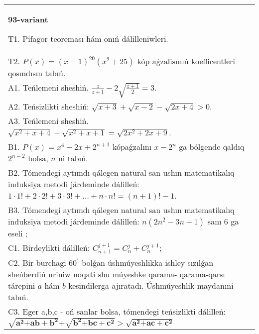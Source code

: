 \documentclass{article}
\begin{document}
\begin{tabular}{m{17cm}}
\textbf{93-variant}
\newline

T1. Pifagor teoreması hám onıń dálilleniwleri. \\
T2. \(P(x) = (x - 1)^{20}\left( x^{2} + 25 \right)\) kóp aǵzalisınıń koefficentleri qosındısın tabıń. \\
A1. Teńlemeni sheshiń. \(\frac{z}{z + 1} - 2\sqrt{\frac{z + 1}{2}} = 3\). \\
A2. Teńsizlikti sheshiń: \(\sqrt{x + 3} + \sqrt{x - 2} - \sqrt{2x + 4} > 0\). \\
A3. Teńlemeni sheshiń. \(\sqrt{x^{2} + x + 4} + \sqrt{x^{2} + x + 1} = \sqrt{2x^{2} + 2x + 9}\). \\
B1. \(P(x) = x^{4} - 2x + 2^{n + 1}\) kópaǵzalını \(x - 2^{n}\) ga bólgende qaldıq \(2^{n - 2}\) bolsa, \(n\) ni tabıń. \\
B2. Tómendegi aytımdı qálegen natural san ushın matematikalıq induksiya metodi járdeminde dálilleń: \(1 \cdot 1! + 2 \cdot 2! + 3 \cdot 3! + \ldots + n \cdot n! = (n + 1)! - 1\). \\
B3. Tómendegi aytımdı qálegen natural san ushın matematikalıq induksiya metodi járdeminde dálilleń: \(n\left( 2n^{2} - 3n + 1 \right)\) sanı 6 ga eseli ; \\
C1. Birdeylikti dálilleń: \(C_{n + 1}^{j + 1} = C_{n}^{j} + C_{n}^{j + 1}\); \\
C2. Bir burchagi \(60^{{^\circ}}\) bolǵan úshmúyeshlikka ishley sızılǵan sheńberdiń uriniw noqati shu múyeshke qarama- qarama-qarsı tárepini \(a\) hám \(b\) kesindilerga ajıratadı. Úshmúyeshlik maydanıni tabıń. \\
C3. Eger a,b,c - oń sanlar bolsa, tómendegi teńsizlikti dálilleń: \(\sqrt{\mathbf{a}^{\mathbf{2}}\mathbf{+ ab +}\mathbf{b}^{\mathbf{2}}}\mathbf{+}\sqrt{\mathbf{b}^{\mathbf{2}}\mathbf{+ bc +}\mathbf{c}^{\mathbf{2}}}\mathbf{>}\sqrt{\mathbf{a}^{\mathbf{2}}\mathbf{+ ac +}\mathbf{c}^{\mathbf{2}}}\) \\

\end{tabular}
\vspace{1cm}
\end{document}
